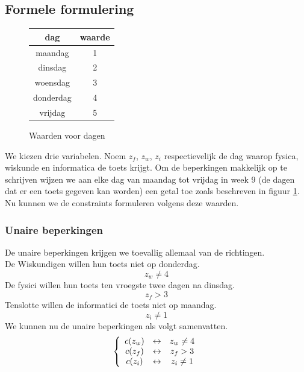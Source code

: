 \documentclass[alternative-exam.tex]{subfiles}
\begin{document}
\subsection{Formele formulering}
\begin{figure}[H]
\centering
\caption{Waarden voor dagen}
\label{waarde_dagen}
\begin{tabular}{| c | c | }
\hline
dag & waarde\\
\hline
maandag & 1\\
dinsdag & 2\\
woensdag & 3\\
donderdag & 4\\
vrijdag & 5\\
\hline
\end{tabular}
\end{figure}
We kiezen drie variabelen. Noem $z_f$, $z_w$, $z_i$ respectievelijk de dag waarop fysica, wiskunde en informatica de toets krijgt. Om de beperkingen makkelijk op te schrijven wijzen we aan elke dag van maandag tot vrijdag in week 9 (de dagen dat er een toets gegeven kan worden) een getal toe zoals beschreven in figuur \ref{waarde_dagen}.
Nu kunnen we de constraints formuleren volgens deze waarden.

\subsubsection{Unaire beperkingen}
De unaire beperkingen krijgen we toevallig allemaal van de richtingen.\\
De Wiskundigen willen hun toets niet op donderdag.
\[
z_w \neq 4
\]
De fysici willen hun toets ten vroegste twee dagen na dinsdag.
\[
z_f > 3
\]
Tenslotte willen de informatici de toets niet op maandag.
\[
z_i \neq 1
\]
We kunnen nu de unaire beperkingen als volgt samenvatten.
\[
\left\lbrace
\begin{array}{c c c}
c(z_w) & \leftrightarrow & z_w \neq 4\\
c(z_f) & \leftrightarrow & z_f > 3\\
c(z_i) & \leftrightarrow & z_i \neq 1\\
\end{array}
\right.
\]
\end{document}
